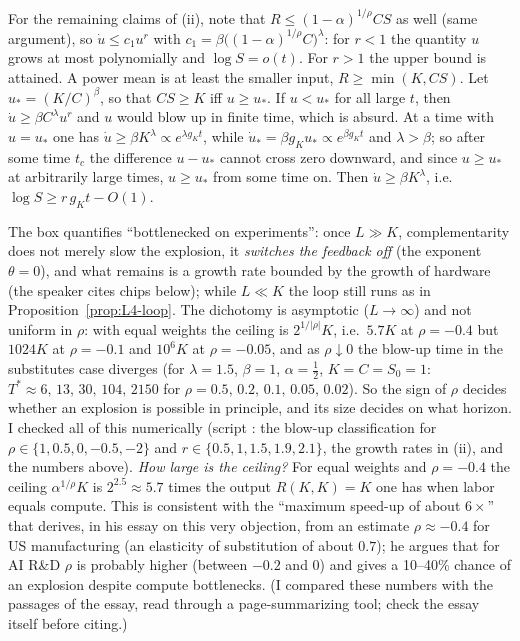 \begin{beyond}
For the remaining claims of (ii), note that $R\le(1-\alpha)^{1/\rho}CS$ as well (same argument), so $\dot u\le c_1u^r$ with $c_1=\beta\big((1-\alpha)^{1/\rho}C\big)^{\lambda}$: for $r<1$ the quantity $u$ grows at most polynomially and $\log S=o(t)$. For $r>1$ the upper bound is attained. A power mean is at least the smaller input, $R\ge\min(K,CS)$. Let $u_*=(K/C)^\beta$, so that $CS\ge K$ iff $u\ge u_*$. If $u<u_*$ for all large $t$, then $\dot u\ge\beta C^\lambda u^r$ and $u$ would blow up in finite time, which is absurd. At a time with $u=u_*$ one has $\dot u\ge\beta K^\lambda\propto e^{\lambda g_Kt}$, while $\dot u_*=\beta g_Ku_*\propto e^{\beta g_Kt}$ and $\lambda>\beta$; so after some time $t_c$ the difference $u-u_*$ cannot cross zero downward, and since $u\ge u_*$ at arbitrarily large times, $u\ge u_*$ from some time on. Then $\dot u\ge\beta K^\lambda$, i.e.\ $\log S\ge r\,g_Kt-O(1)$. \hfill\qedsymbol\par
The box quantifies ``bottlenecked on experiments'': once $L\gg K$, complementarity does not merely slow the explosion, it \emph{switches the feedback off} (the exponent $\theta=0$), and what remains is a growth rate bounded by the growth of hardware (the speaker cites chips below); while $L\ll K$ the loop still runs as in Proposition~\ref{prop:L4-loop}. The dichotomy is asymptotic ($L\to\infty$) and not uniform in $\rho$: with equal weights the ceiling is $2^{1/|\rho|}K$, i.e.\ $5.7K$ at $\rho=-0.4$ but $1024K$ at $\rho=-0.1$ and $10^6K$ at $\rho=-0.05$, and as $\rho\downarrow0$ the blow-up time in the substitutes case diverges (for $\lambda=1.5$, $\beta=1$, $\alpha=\tfrac12$, $K=C=S_0=1$: $T^*\approx6,\,13,\,30,\,104,\,2150$ for $\rho=0.5,\,0.2,\,0.1,\,0.05,\,0.02$). So the sign of $\rho$ decides whether an explosion is possible in principle, and its size decides on what horizon. I checked all of this numerically (script : the blow-up classification for $\rho\in\{1,0.5,0,-0.5,-2\}$ and $r\in\{0.5,1,1.5,1.9,2.1\}$, the growth rates in (ii), and the numbers above).
\emph{How large is the ceiling?} For equal weights and $\rho=-0.4$ the ceiling $\alpha^{1/\rho}K$ is $2^{2.5}\approx5.7$ times the output $R(K,K)=K$ one has when labor equals compute. This is consistent with the ``maximum speed-up of about $6\times$'' that \citet{davidson2025} derives, in his essay on this very objection, from an estimate $\rho\approx-0.4$ for US manufacturing (an elasticity of substitution of about $0.7$); he argues that for AI R\&D $\rho$ is probably higher (between $-0.2$ and $0$) and gives a 10--40\% chance of an explosion despite compute bottlenecks. (I compared these numbers with the passages of the essay, read through a page-summarizing tool; check the essay itself before citing.)
\end{beyond}


